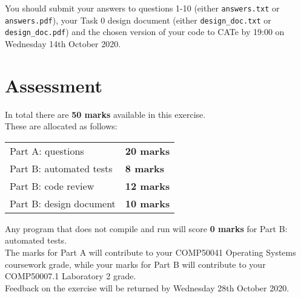 \documentclass[a4paper,12pt]{article}
\newcommand{\shell}[1]{\lstinline!#1!}
\begin{document}
You should submit your answers to questions 1-10 (either \shell{answers.txt} or \shell{answers.pdf}), your Task 0 design document (either \shell{design_doc.txt} or \shell{design_doc.pdf}) and the chosen version of your code to CATe by 19:00 on Wednesday 14th October 2020.\\


\section*{Assessment}
In total there are {\bf 50 marks} available in this exercise.\\
These are allocated as follows:
%
\begin{center}
\begin{tabular}{l@{\qquad\qquad}l}
  Part A: questions       & {\bf 20 marks} \\
  Part B: automated tests & {\bf 8 marks} \\
  Part B: code review     & {\bf 12 marks} \\
  Part B: design document & {\bf 10 marks} \\    
\end{tabular}
\end{center}
%
Any program that does not compile and run will score {\bf 0 marks} for Part B: automated tests.\\[-0.8em]

\noindent The marks for Part A will contribute to your COMP50041 Operating Systems coursework grade,
while your marks for Part B will contribute to your COMP50007.1 Laboratory 2 grade.\\[-0.8em]


\noindent Feedback on the exercise will be returned by Wednesday 28th October 2020.


\end{document}
